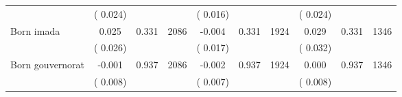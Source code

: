\begin{tabular}{l*{9}{c}}
                               &        (       0.024) & &                                                                 &       (       0.016) & &                                                          &       (       0.024) & &                                          \\ 
 Born imada                        &              0.025                &        0.331 & 2086                &             -0.004 &        0.331 & 1924                       &        0.029 &        0.331 & 1346                             \\ 
                               &        (       0.026) & &                                                                        &       (       0.017) & &                                                         &       (       0.032) & &                                         \\ 
 Born gouvernorat                        &             -0.001                &        0.937 & 2086                &             -0.002 &        0.937 & 1924                       &        0.000 &        0.937 & 1346                             \\ 
                               &        (       0.008) & &                                                                        &       (       0.007) & &                                                         &       (       0.008) & &                                         \\ 
\hline \end{tabular}                                                                                                                                                      